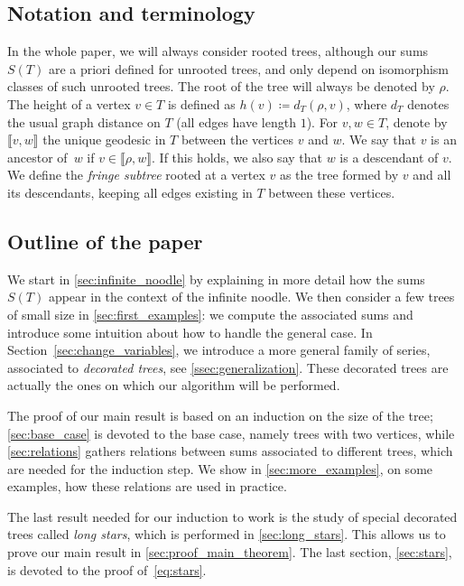 \documentclass[12pt]{amsart}
\theoremstyle{plain}
\theoremstyle{remark}
\begin{document}
\subsection{Notation and terminology}
In the whole paper, we will always consider rooted trees, although our sums $S(T)$ are a priori defined for unrooted trees, and only depend on isomorphism classes of such unrooted trees.
The root of the tree will always be denoted by $\rho$. The height of a vertex $v \in T$ is defined as $h(v) \coloneqq  d_T(\rho,v)$, where $d_T$ denotes the usual graph distance on $T$ (all edges have length $1$). For $v,w \in T$, denote by $\llbracket v,w \rrbracket$ the unique geodesic in $T$ between the vertices $v$ and $w$. We say that $v$ is an ancestor of~$w$ if $v \in \llbracket \rho, w \rrbracket$. If this holds, we also say that $w$ is a descendant of $v$. We define the \textit{fringe subtree} rooted at a vertex $v$ as the tree formed by $v$ and all its descendants, keeping all edges existing in $T$ between these vertices.


\subsection{Outline of the paper}

We start in \cref{sec:infinite_noodle} by explaining in more detail how the sums $S(T)$ appear in the context of the infinite noodle. We then consider a few trees of small size in \cref{sec:first_examples}: we compute the associated sums and introduce some intuition about how to handle the general case. In Section~\ref{sec:change_variables}, we introduce a more general family of series, associated to \textit{decorated trees}, see \cref{ssec:generalization}. These decorated trees are actually the ones on which our algorithm will be performed. 

The proof of our main result is based on an induction on the size of the tree; \cref{sec:base_case} is devoted to the base case, namely trees with two vertices, while \cref{sec:relations} gathers relations between sums associated to different trees, which are needed for the induction step. We show in \cref{sec:more_examples}, on some examples, how these relations are used in practice. 

The last result needed for our induction to work is the study of special decorated trees called \textit{long stars}, which is performed in \cref{sec:long_stars}. This allows us to prove our main result in \cref{sec:proof_main_theorem}. The last section, \cref{sec:stars}, is devoted to the proof of~\eqref{eq:stars}. 
\end{document}

